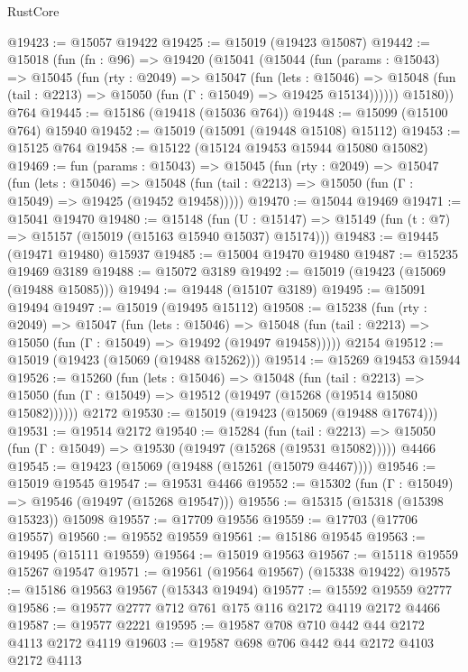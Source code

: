 \begin{lexlean}{RustCore}
\begin{coremodule}
@19423 := @15057 @19422
@19425 := @15019 (@19423 @15087)
@19442 := @15018
    (fun (fn : @96) =>
    @19420
      (@15041
        (@15044
          (fun (params : @15043) =>
          @15045
            (fun (rty : @2049) =>
            @15047
              (fun (lets : @15046) =>
              @15048 (fun (tail : @2213) => @15050 (fun (Γ : @15049) => @19425 @15134))))))
        @15180))
    @764
@19445 := @15186 (@19418 (@15036 @764))
@19448 := @15099 (@15100 @764) @15940
@19452 := @15019 (@15091 (@19448 @15108) @15112)
@19453 := @15125 @764
@19458 := @15122 (@15124 @19453 @15944 @15080 @15082)
@19469 := fun (params : @15043) =>
  @15045
    (fun (rty : @2049) =>
    @15047
      (fun (lets : @15046) =>
      @15048 (fun (tail : @2213) => @15050 (fun (Γ : @15049) => @19425 (@19452 @19458)))))
@19470 := @15044 @19469
@19471 := @15041 @19470
@19480 := @15148
    (fun (U : @15147) => @15149 (fun (t : @7) => @15157 (@15019 (@15163 @15940 @15037) @15174)))
@19483 := @19445 (@19471 @19480) @15937
@19485 := @15004 @19470 @19480
@19487 := @15235 @19469 @3189
@19488 := @15072 @3189
@19492 := @15019 (@19423 (@15069 (@19488 @15085)))
@19494 := @19448 (@15107 @3189)
@19495 := @15091 @19494
@19497 := @15019 (@19495 @15112)
@19508 := @15238
    (fun (rty : @2049) =>
    @15047
      (fun (lets : @15046) =>
      @15048 (fun (tail : @2213) => @15050 (fun (Γ : @15049) => @19492 (@19497 @19458)))))
    @2154
@19512 := @15019 (@19423 (@15069 (@19488 @15262)))
@19514 := @15269 @19453 @15944
@19526 := @15260
    (fun (lets : @15046) =>
    @15048
      (fun (tail : @2213) =>
      @15050 (fun (Γ : @15049) => @19512 (@19497 (@15268 (@19514 @15080 @15082))))))
    @2172
@19530 := @15019 (@19423 (@15069 (@19488 @17674)))
@19531 := @19514 @2172
@19540 := @15284
    (fun (tail : @2213) => @15050 (fun (Γ : @15049) => @19530 (@19497 (@15268 (@19531 @15082)))))
    @4466
@19545 := @19423 (@15069 (@19488 (@15261 (@15079 @4467))))
@19546 := @15019 @19545
@19547 := @19531 @4466
@19552 := @15302 (fun (Γ : @15049) => @19546 (@19497 (@15268 @19547)))
@19556 := @15315 (@15318 (@15398 @15323)) @15098
@19557 := @17709 @19556
@19559 := @17703 (@17706 @19557)
@19560 := @19552 @19559
@19561 := @15186 @19545
@19563 := @19495 (@15111 @19559)
@19564 := @15019 @19563
@19567 := @15118 @19559 @15267 @19547
@19571 := @19561 (@19564 @19567) (@15338 @19422)
@19575 := @15186 @19563 @19567 (@15343 @19494)
@19577 := @15592 @19559 @2777
@19586 := @19577 @2777 @712 @761 @175 @116 @2172 @4119 @2172 @4466
@19587 := @19577 @2221
@19595 := @19587 @708 @710 @442 @44 @2172 @4113 @2172 @4119
@19603 := @19587 @698 @706 @442 @44 @2172 @4103 @2172 @4113

\end{coremodule}
\end{lexlean}
